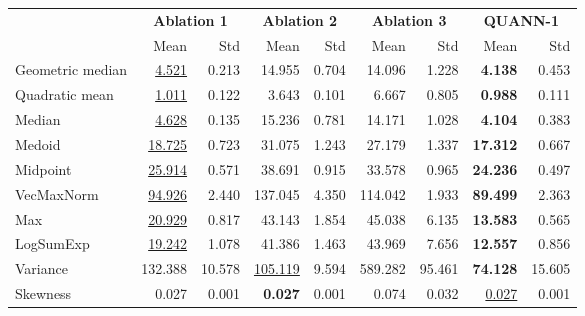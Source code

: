 \begin{tabular}{lrrrrrrrr}
\toprule
 & \multicolumn{2}{c}{\textbf{Ablation 1}} & \multicolumn{2}{c}{\textbf{Ablation 2}} & \multicolumn{2}{c}{\textbf{Ablation 3}} & \multicolumn{2}{c}{\textbf{QUANN-1}} \\
\cmidrule(r){2-3} \cmidrule(r){4-5} \cmidrule(r){6-7} \cmidrule(r){8-9}
 & Mean & Std & Mean & Std & Mean & Std & Mean & Std \\
\midrule
Geometric median & \underline{4.521} & 0.213 & 14.955 & 0.704 & 14.096 & 1.228 & \textbf{4.138} & 0.453 \\
Quadratic mean & \underline{1.011} & 0.122 & 3.643 & 0.101 & 6.667 & 0.805 & \textbf{0.988} & 0.111 \\
Median & \underline{4.628} & 0.135 & 15.236 & 0.781 & 14.171 & 1.028 & \textbf{4.104} & 0.383 \\
Medoid & \underline{18.725} & 0.723 & 31.075 & 1.243 & 27.179 & 1.337 & \textbf{17.312} & 0.667 \\
Midpoint & \underline{25.914} & 0.571 & 38.691 & 0.915 & 33.578 & 0.965 & \textbf{24.236} & 0.497 \\
VecMaxNorm & \underline{94.926} & 2.440 & 137.045 & 4.350 & 114.042 & 1.933 & \textbf{89.499} & 2.363 \\
Max & \underline{20.929} & 0.817 & 43.143 & 1.854 & 45.038 & 6.135 & \textbf{13.583} & 0.565 \\
LogSumExp & \underline{19.242} & 1.078 & 41.386 & 1.463 & 43.969 & 7.656 & \textbf{12.557} & 0.856 \\
Variance & 132.388 & 10.578 & \underline{105.119} & 9.594 & 589.282 & 95.461 & \textbf{74.128} & 15.605 \\
Skewness & 0.027 & 0.001 & \textbf{0.027} & 0.001 & 0.074 & 0.032 & \underline{0.027} & 0.001 \\
\bottomrule
\end{tabular}